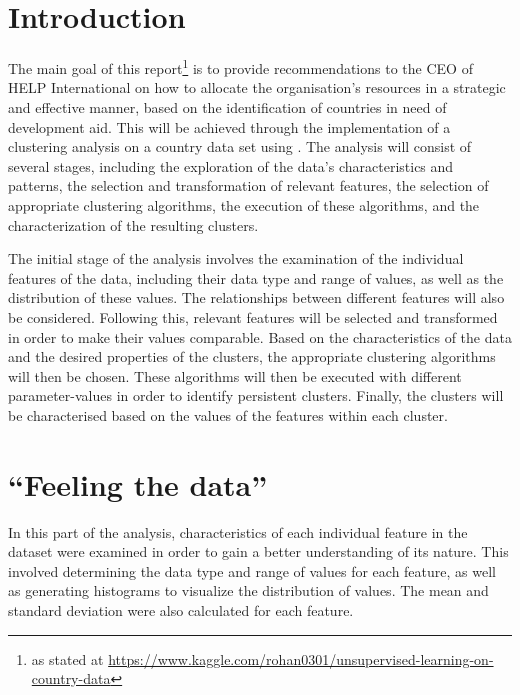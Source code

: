 \documentclass[
  course = {{DS12E Clustering Algorithms}},
  quartile = {{2}},
  assignment = 2,
  name = {{Michael Darmanis ; Vasilios Venieris}},
  studentnumber = {{7115152200004 ; 7115152200017}},
  email = {{mdarm@di.uoa.gr ; vvenieris@di.uoa.gr}},
  firstexercise = 1
]{aga-homework}
\begin{document}
\section{Introduction}

The main goal of this report\footnote{as stated at \url{https://www.kaggle.com/rohan0301/unsupervised-learning-on-country-data}} is to provide recommendations to the CEO of HELP International on how to allocate the organisation's resources in a strategic and effective manner, based on the identification of countries in need of development aid. This will be achieved through the implementation of a clustering analysis on a country data set using \matlab. The analysis will consist of several stages, including the exploration of the data's characteristics and patterns, the selection and transformation of relevant features, the selection of appropriate clustering algorithms, the execution of these algorithms, and the characterization of the resulting clusters.

The initial stage of the analysis involves the examination of the individual features of the data, including their data type and range of values, as well as the distribution of these values. The relationships between different features will also be considered. Following this, relevant features will be selected and transformed in order to make their values comparable. Based on the characteristics of the data and the desired properties of the clusters, the appropriate clustering algorithms will then be chosen. These algorithms will then be executed with different parameter-values in order to identify persistent clusters. Finally, the clusters will be characterised based on the values of the features within each cluster.

\section{``Feeling the data''}\label{sec:feel}

In this part of the analysis, characteristics of each individual feature in the dataset were examined in order to gain a better understanding of its nature. This involved determining the data type and range of values for each feature, as well as generating histograms to visualize the distribution of values. The mean and standard deviation were also calculated for each feature.
\end{document}
